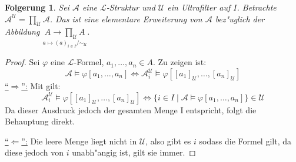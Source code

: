 \documentclass[a4paper,12pt,numbers=noenddot,parskip=full]{scrartcl}
\newcommand{\scrL}{\mathcal{L}}
\newcommand{\scrA}{\mathcal{A}}
\newcommand{\scrU}{\mathcal{U}}
\theoremstyle{dotless}
\newtheorem{corollary}[theorem]{Folgerung}
\theoremstyle{remark}
\begin{document}
\begin{corollary}
	Sei $\scrA$ eine $\scrL$-Struktur und $\scrU$ ein Ultrafilter auf $I$. Betrachte $\scrA^\scrU = \prod\limits_{\scrU} \scrA$. Das ist eine elementare Erweiterung von $\scrA$ bez"uglich der Abbildung $\underset{a \longmapsto (a)_{i \in I}/\sim_\scrU}{A \longrightarrow \prod\limits_{\scrU} A}$.
\end{corollary}
\begin{proof}
	Sei $\varphi$ eine $\scrL$-Formel, $a_1, \dots, a_n \in A$. Zu zeigen ist:
	\begin{equation*}
		\scrA \models \varphi[a_1, \dots, a_n] \Longleftrightarrow \scrA_i^\scrU \models \varphi[[a_1]_\scrU , \dots, [a_n]_\scrU]
	\end{equation*}
	\underline{"`$\Rightarrow$"':} Mit  gilt:
	\begin{equation*}
		\scrA_i^\scrU \models \varphi[[a_1]_\scrU , \dots, [a_n]_\scrU] \Longleftrightarrow \{i \in I \mid \scrA \models \varphi[a_1, \dots, a_n] \} \in \scrU
	\end{equation*}
	Da dieser Ausdruck jedoch der gesamten Menge I entspricht, folgt die Behauptung direkt.
	
	\underline{"`$\Leftarrow$"':} Die leere Menge liegt nicht in $\scrU$, also gibt es $i$ sodass die Formel gilt, da diese jedoch von $i$ unabh"angig ist, gilt sie immer.
\end{proof}
\end{document}
